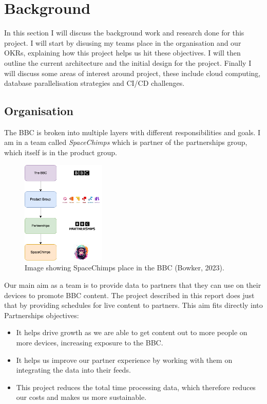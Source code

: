 \section{Background}
  In this section I will discuss the background work and research done for this project. I will start by disusing my teams place in the organisation and 
  our OKRs, explaining how this project helps us hit these objectives. I will then outline the current architecture and the initial design for the project.
  Finally I will discuss some areas of interest around project, these include cloud computing, database parallelisation strategies and CI/CD challenges.

  \subsection{Organisation}
  The BBC is broken into multiple layers with different responsibilities and goals. I am in a team called \textit{SpaceChimps} which is partner of
  the partnerships group, which itself is in the product group.

  \begin{figure}[H]
    \centering
    \includegraphics[width=4cm]{assets/bbcHierarchy.drawio.png}
    \caption{Image showing SpaceChimps place in the BBC (Bowker, 2023).}
    \label{fig:bbcHierarchy}
  \end{figure}

  Our main aim as a team is to provide data to partners that they can use on their devices to promote BBC content. The project described in this report does
  just that by providing schedules for live content to partners. This aim fits directly into Partnerships objectives:

  \begin{itemize}
    \item It helps drive growth as we are able to get content out to more people on more devices, increasing exposure to the BBC.
    \item It helps us improve our partner experience by working with them on integrating the data into their feeds.
    \item This project reduces the total time processing data, which therefore reduces our costs and makes us more sustainable.
  \end{itemize}

